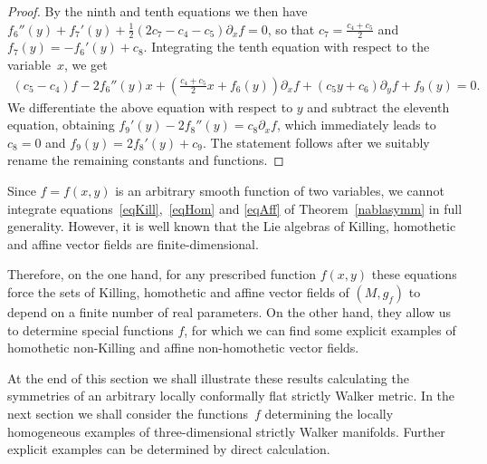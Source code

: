 \documentclass[pdftex]{sigma}
\numberwithin{equation}{section}
\begin{document}
\begin{proof}
By the ninth and tenth equations we then have $f_6 ''(y)+f_7 '(y)+\frac12(2c_7-c_4-c_5)\partial_xf=0$, so that $c_7=\frac{c_4+c_5}{2}$ and $f_7(y)=-f_6 '(y)+c_8$. Integrating the tenth equation with respect to the variable~$x$, we get
\begin{gather*}
(c_5-c_4)f-2f_6 ''(y)x+\left(\frac{c_4+c_5}{2}x+f_6(y)\right)\partial_xf+(c_5y+c_6)\partial_yf+f_9(y)=0.
\end{gather*}
We dif\/ferentiate the above equation with respect to $y$ and subtract the eleventh equation, obtaining $f_9 '(y)-2f_8 ''(y)=c_8\partial_xf$, which immediately leads to $c_8=0$ and $f_9(y)=2f_8 '(y)+c_9$. The statement follows after we {suitably rename} the remaining constants and functions.
\end{proof}

\begin{Remark}Since $f=f(x,y)$ is an arbitrary smooth function of two variables, we cannot integrate equations~\eqref{eqKill},~\eqref{eqHom} and \eqref{eqAff} of Theorem~\ref{nablasymm} in full generality. However, it is well known that the Lie algebras of Killing, homothetic and af\/f\/ine vector f\/ields are f\/inite-dimensional.

Therefore, on the one hand, for any prescribed function $f(x,y)$ these equations force the sets of Killing, homothetic and af\/f\/ine vector f\/ields of $(M,g_f)$ to depend on a f\/inite number of real parameters. On the other hand, they allow us to determine special functions $f$, for which we can f\/ind some explicit examples of homothetic non-Killing and af\/f\/ine non-homothetic vector f\/ields.

At the end of this {section} we shall illustrate these results calculating the symmetries of an arbitrary locally conformally f\/lat strictly Walker metric. In the next section we shall consider the functions~$f$ determining the locally homogeneous examples of three-dimensional strictly Walker manifolds. Further explicit examples can be determined by direct calculation.
\end{Remark}
\end{document}
